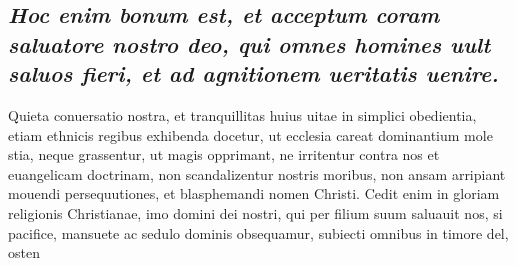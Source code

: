 \documentclass{article}
\begin{document}
\begin{pages}
{}
\subsection*{\textit{Hoc enim bonum est, et acceptum coram saluatore nostro deo, qui omnes homines uult saluos fieri, et ad agnitionem ueritatis uenire. }}\pstart Quieta conuersatio nostra, et tranquillitas huius uitae in simplici obedientia, etiam ethnicis regibus exhibenda docetur, ut ecclesia careat dominantium mole stia, neque  grassentur, ut magis opprimant, ne irritentur contra nos et euangelicam doctrinam, non scandalizentur nostris moribus, non ansam arripiant mouendi persequutiones, et blasphemandi nomen Christi. Cedit enim in gloriam religionis Christianae, imo domini dei nostri, qui per filium suum saluauit nos, si pacifice, mansuete ac sedulo dominis obsequamur, subiecti omnibus in timore del, osten\pend

\end{pages}
\end{document}
